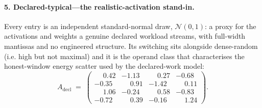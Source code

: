 \documentclass{article}
\theoremstyle{plain}
\theoremstyle{definition}
\theoremstyle{remark}
\begin{document}
\paragraph{5. Declared-typical---the realistic-activation stand-in.}
Every entry is an independent standard-normal draw, $\mathcal{N}(0,1)$: a
proxy for the activations and weights a genuine declared workload streams,
with full-width mantissas and no engineered structure. Its switching sits
alongside dense-random (i.e. high but not maximal) and it is the operand class
that characterises the honest-window energy scatter used by the declared-work
model:
\begin{equation*}
	A_{\mathrm{decl}} \;=\;
	\begin{pmatrix}
		\phantom{-}0.42 & -1.13 & \phantom{-}0.27 & -0.68 \\
		-0.35 & \phantom{-}0.91 & -1.42 & \phantom{-}0.11 \\
		\phantom{-}1.06 & -0.24 & \phantom{-}0.58 & -0.83 \\
		-0.72 & \phantom{-}0.39 & -0.16 & \phantom{-}1.24
	\end{pmatrix}.
\end{equation*}
\end{document}
